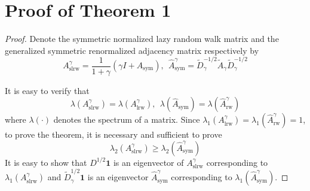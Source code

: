 \documentclass{article}
\newcommand{\0}{{\boldsymbol{0}}}
\newcommand{\6}{{\partial}}
\newcommand{\8}{{\infty}}
\newcommand{\4}{{\nabla}}
\begin{document}
\iffalse
\section{Proof of Theorem 1}
\label{apprndix:proof_eigengap}
\begin{proof}
Denote the symmetric normalized lazy random walk matrix
and the generalized symmetric renormalized adjacency matrix respectively by
$$
A_{\text{slrw}}^\gamma = \frac{1}{1+\gamma}(\gamma I + A_{\text{sym}}),\ \ 
\hat{A}_\text{sym}^\gamma = \tilde{D}_\gamma^{-1/2} \tilde{A}_\gamma \tilde{D}_\gamma^{-1/2}
$$

It is easy to verify that 
$$
\lambda(A_{\text{slrw}}^\gamma) = \lambda(A_{\text{lrw}}^\gamma), \ \ 
\lambda( \hat{A}_\text{sym}) = \lambda( \hat{A}_\text{rw}^\gamma)
$$
where $\lambda(\cdot)$ denotes the spectrum of a matrix.
Since $\lambda_1(A_\text{lrw}^\gamma) = \lambda_1(\hat{A}_\text{rw}^\gamma) = 1$, 
to prove the theorem, it is necessary and sufficient to prove
\begin{equation}
    \lambda_2(A_{\text{slrw}}^\gamma) \geq \lambda_2(\hat{A}_{\text{sym}}^\gamma) \end{equation}
It is easy to show that $D^{1/2} \bm{1}$ is an eigenvector of $A_{\text{slrw}}^\gamma$
corresponding to $\lambda_1(A_{\text{slrw}}^\gamma)$
and $\tilde{D}_\gamma^{1/2} \bm{1}$ is an eigenvector $\hat{A}_\text{sym}^\gamma$
corresponding to $\lambda_1(\hat{A}_\text{sym}^\gamma)$. 



\end{proof}
\end{document}
